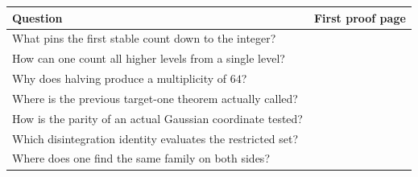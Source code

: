 \documentclass[12pt,letterpaper]{article}
\begin{document}
\begin{center}\small\begin{tabularx}{.97\linewidth}{@{}Yr@{}}\toprule
Question & First proof page\\\midrule
What pins the first stable count down to the integer? & \pageref{extract-FourBase139}\\
How can one count all higher levels from a single level? & \pageref{extract-FourLift64}\\
Why does halving produce a multiplicity of $64$? & \pageref{extract-FourEven52}\\
Where is the previous target-one theorem actually called? & \pageref{extract-FourCounts33}\\
How is the parity of an actual Gaussian coordinate tested? & \pageref{extract-FourTubes7}\\
Which disintegration identity evaluates the restricted set? & \pageref{extract-FourContact96}\\
Where does one find the same family on both sides? & \pageref{extract-FourEndpoint106}\\\bottomrule
\end{tabularx}\end{center}
\end{document}
